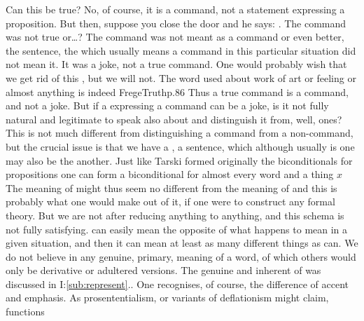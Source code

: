 \label{pa:whatcanbetrue}
\pa {} Can this be true?
No, of course, it is a command, not a statement expressing a proposition. But
then, suppose you close the door and he says: . The command was not true or\ldots? The command was not meant as a
command or even better, the sentence, the  which usually means a
command in this particular situation did not mean it. It was a joke, not a true
command. One would probably wish that we get rid of this , but we will
not. The word  used about work of art or feeling or almost anything is
indeed \citet{put in front of another word in order to show that this word is to
  be understood in its proper, unadulterated sense.}{FregeTruth}{p.86} Thus a
true command is a command, and not a joke.  But if a  expressing a
command can be a joke, is it not fully natural and legitimate to speak also
about  and distinguish it from, well,  ones? This is
not much different from distinguishing a command from a non-command, but the
crucial issue is that we have a , a sentence, which although usually is
one may also be the another. Just like Tarski formed originally the
biconditionals for propositions
%
%
one can form a biconditional for almost every word and a thing $x$
The meaning of  might thus seem no different from the meaning of
 and this is probably what one would make out of it, if one were to
construct any formal theory.
But we are not after reducing anything to anything, and this schema is not fully
satisfying.  can easily mean the opposite of what 
happens to mean in a given situation, and then it can mean at least as many
different things as  can. We do not believe in any genuine, primary,
 meaning of a word, of which others would only be derivative or
adultered versions. The genuine and inherent  of  was
discussed in I:\ref{sub:represent}..  One
recognises, of course, the difference of accent and emphasis. As
prosententialism, or variants of deflationism might claim,  functions
